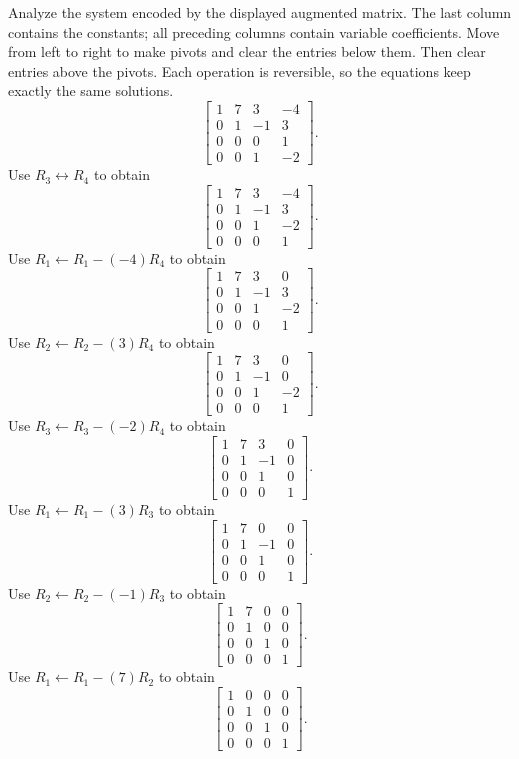 \goal Analyze the system encoded by the displayed augmented matrix. The last column contains the constants; all preceding columns contain variable coefficients.
\idea Move from left to right to make pivots and clear the entries below them. Then clear entries above the pivots. Each operation is reversible, so the equations keep exactly the same solutions.
\[ \left[\begin{array}{rrr|r}1&7&3&-4\\0&1&-1&3\\0&0&0&1\\0&0&1&-2\end{array}\right].\]
Use $R_{3}\leftrightarrow R_{4}$ to obtain
\[ \left[\begin{array}{rrr|r}1&7&3&-4\\0&1&-1&3\\0&0&1&-2\\0&0&0&1\end{array}\right].\]
Use $R_{1}\leftarrow R_{1}-(-4)R_{4}$ to obtain
\[ \left[\begin{array}{rrr|r}1&7&3&0\\0&1&-1&3\\0&0&1&-2\\0&0&0&1\end{array}\right].\]
Use $R_{2}\leftarrow R_{2}-(3)R_{4}$ to obtain
\[ \left[\begin{array}{rrr|r}1&7&3&0\\0&1&-1&0\\0&0&1&-2\\0&0&0&1\end{array}\right].\]
Use $R_{3}\leftarrow R_{3}-(-2)R_{4}$ to obtain
\[ \left[\begin{array}{rrr|r}1&7&3&0\\0&1&-1&0\\0&0&1&0\\0&0&0&1\end{array}\right].\]
Use $R_{1}\leftarrow R_{1}-(3)R_{3}$ to obtain
\[ \left[\begin{array}{rrr|r}1&7&0&0\\0&1&-1&0\\0&0&1&0\\0&0&0&1\end{array}\right].\]
Use $R_{2}\leftarrow R_{2}-(-1)R_{3}$ to obtain
\[ \left[\begin{array}{rrr|r}1&7&0&0\\0&1&0&0\\0&0&1&0\\0&0&0&1\end{array}\right].\]
Use $R_{1}\leftarrow R_{1}-(7)R_{2}$ to obtain
\[ \left[\begin{array}{rrr|r}1&0&0&0\\0&1&0&0\\0&0&1&0\\0&0&0&1\end{array}\right].\]

